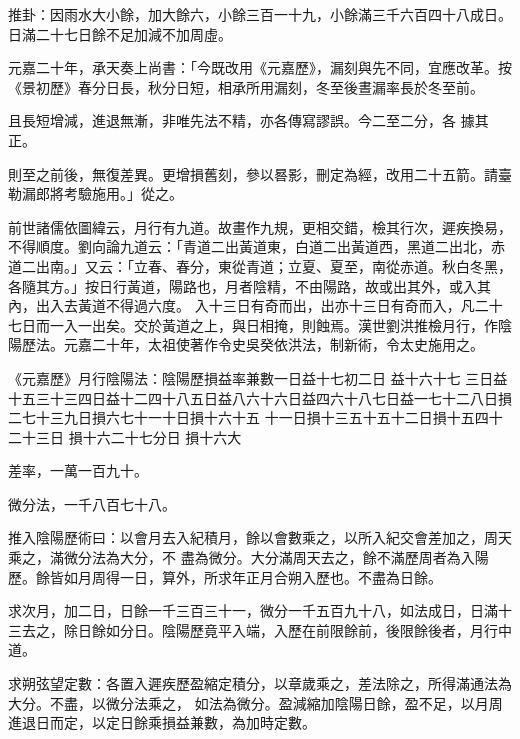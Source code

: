 \begin{pinyinscope}
 推卦：因雨水大小餘，加大餘六，小餘三百一十九，小餘滿三千六百四十八成日。日滿二十七日餘不足加減不加周虛。



 元嘉二十年，承天奏上尚書：「今既改用《元嘉歷》，漏刻與先不同，宜應改革。按《景初歷》春分日長，秋分日短，相承所用漏刻，冬至後晝漏率長於冬至前。



 且長短增減，進退無漸，非唯先法不精，亦各傳寫謬誤。今二至二分，各
 據其正。



 則至之前後，無復差異。更增損舊刻，參以晷影，刪定為經，改用二十五箭。請臺勒漏郎將考驗施用。」從之。



 前世諸儒依圖緯云，月行有九道。故畫作九規，更相交錯，檢其行次，遲疾換易，不得順度。劉向論九道云：「青道二出黃道東，白道二出黃道西，黑道二出北，赤道二出南。」又云：「立春、春分，東從青道；立夏、夏至，南從赤道。秋白冬黑，各隨其方。」按日行黃道，陽路也，月者陰精，不由陽路，故或出其外，或入其內，出入去黃道不得過六度。
 入十三日有奇而出，出亦十三日有奇而入，凡二十七日而一入一出矣。交於黃道之上，與日相掩，則蝕焉。漢世劉洪推檢月行，作陰陽歷法。元嘉二十年，太祖使著作令史吳癸依洪法，制新術，令太史施用之。


《元嘉歷》月行陰陽法：陰陽歷損益率兼數一日益十七初二日
 益十六十七
 三日益十五三十三四日益十二四十八五日益八六十六日益四六十八七日益一七十二八日損二七十三九日損六七十一十日損十六十五
 十一日損十三五十五十二日損十五四十二十三日
 損十六二十七分日
 損十六大



 差率，一萬一百九十。



 微分法，一千八百七十八。



 推入陰陽歷術曰：以會月去入紀積月，餘以會數乘之，以所入紀交會差加之，周天乘之，滿微分法為大分，不
 盡為微分。大分滿周天去之，餘不滿歷周者為入陽歷。餘皆如月周得一日，算外，所求年正月合朔入歷也。不盡為日餘。



 求次月，加二日，日餘一千三百三十一，微分一千五百九十八，如法成日，日滿十三去之，除日餘如分日。陰陽歷竟平入端，入歷在前限餘前，後限餘後者，月行中道。



 求朔弦望定數：各置入遲疾歷盈縮定積分，以章歲乘之，差法除之，所得滿通法為大分。不盡，以微分法乘之，
 如法為微分。盈減縮加陰陽日餘，盈不足，以月周進退日而定，以定日餘乘損益兼數，為加時定數。




\end{pinyinscope}
